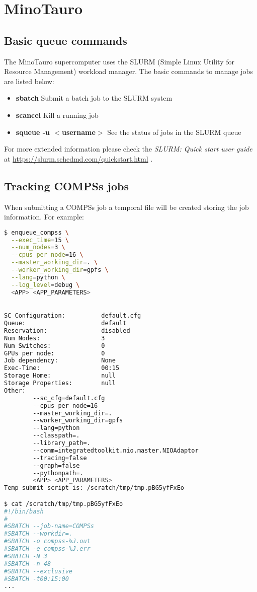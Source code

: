 \section{MinoTauro}
\label{sec:minotauro}

\subsection{Basic queue commands}

The MinoTauro supercomputer uses the SLURM (Simple Linux Utility for Resource Management) workload manager. The basic commands 
to manage jobs are listed below:

\begin{itemize}
 \item \textbf{sbatch} Submit a batch job to the SLURM system
 \item \textbf{scancel} Kill a running job 
 \item \textbf{squeue -u $<$username$>$} See the status of jobs in the SLURM queue
\end{itemize}

For more extended information please check the \textit{SLURM: Quick start user guide} at 
\url{https://slurm.schedmd.com/quickstart.html} .


\subsection{Tracking COMPSs jobs}

When submitting a COMPSs job a temporal file will be created storing the job information. For example:

\begin{lstlisting}[language=bash]
$ enqueue_compss \
  --exec_time=15 \
  --num_nodes=3 \
  --cpus_per_node=16 \
  --master_working_dir=. \
  --worker_working_dir=gpfs \
  --lang=python \
  --log_level=debug \
  <APP> <APP_PARAMETERS>

  
SC Configuration:          default.cfg
Queue:                     default
Reservation:               disabled
Num Nodes:                 3
Num Switches:              0
GPUs per node:             0
Job dependency:            None
Exec-Time:                 00:15
Storage Home:              null
Storage Properties:        null
Other:                     
        --sc_cfg=default.cfg
        --cpus_per_node=16
        --master_working_dir=.
        --worker_working_dir=gpfs
        --lang=python
        --classpath=.
        --library_path=.
        --comm=integratedtoolkit.nio.master.NIOAdaptor
        --tracing=false
        --graph=false
        --pythonpath=.
        <APP> <APP_PARAMETERS>
Temp submit script is: /scratch/tmp/tmp.pBG5yfFxEo

$ cat /scratch/tmp/tmp.pBG5yfFxEo
#!/bin/bash
#
#SBATCH --job-name=COMPSs
#SBATCH --workdir=. 
#SBATCH -o compss-%J.out
#SBATCH -e compss-%J.err
#SBATCH -N 3
#SBATCH -n 48
#SBATCH --exclusive
#SBATCH -t00:15:00 
...
\end{lstlisting}

